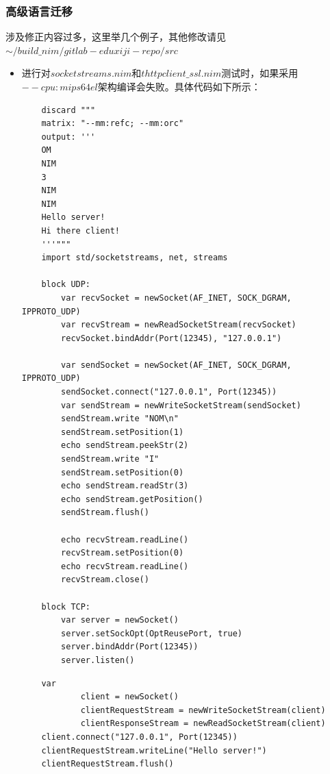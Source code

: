 \documentclass[UTF8]{ctexart}
\begin{document}
		\subsubsection{高级语言迁移} %
		涉及修正内容过多，这里举几个例子，其他修改请见$ \sim/build\_nim/gitlab-eduxiji-repo/src $ %
		\begin{itemize}[leftmargin=3.5em]
			\item 进行对$ socketstreams.nim $和$ thttpclient\_ssl.nim $测试时，如果采用$ --cpu:mips64el $架构编译会失败。具体代码如下所示：
			\begin{tcolorbox}[colback=gray!20, colframe=gray!20, rounded corners, boxrule=-5pt, width=0.8\textwidth, left=0pt, right=0pt, top=0pt, bottom=0pt]
				\begin{verbatim}
	discard """
	matrix: "--mm:refc; --mm:orc"
  	output: '''
	OM
	NIM
	3
	NIM
	NIM
	Hello server!
	Hi there client!
	'''"""
	import std/socketstreams, net, streams

	block UDP:
  		var recvSocket = newSocket(AF_INET, SOCK_DGRAM, IPPROTO_UDP)
  		var recvStream = newReadSocketStream(recvSocket)
  		recvSocket.bindAddr(Port(12345), "127.0.0.1")

  		var sendSocket = newSocket(AF_INET, SOCK_DGRAM, IPPROTO_UDP)
  		sendSocket.connect("127.0.0.1", Port(12345))
  		var sendStream = newWriteSocketStream(sendSocket)
  		sendStream.write "NOM\n"
  		sendStream.setPosition(1)
  		echo sendStream.peekStr(2)
  		sendStream.write "I"
  		sendStream.setPosition(0)
  		echo sendStream.readStr(3)
  		echo sendStream.getPosition()
  		sendStream.flush()

  		echo recvStream.readLine()
 	 	recvStream.setPosition(0)
  		echo recvStream.readLine()
  		recvStream.close()

	block TCP:
  		var server = newSocket()
  		server.setSockOpt(OptReusePort, true)
  		server.bindAddr(Port(12345))
  		server.listen()
				\end{verbatim}
			\end{tcolorbox}
			\newpage
			\begin{tcolorbox}[colback=gray!20, colframe=gray!20, rounded corners, boxrule=-5pt, width=0.8\textwidth, left=0pt, right=0pt, top=0pt, bottom=0pt]
				\begin{verbatim}
	var
    		client = newSocket()
    		clientRequestStream = newWriteSocketStream(client)
    		clientResponseStream = newReadSocketStream(client)
  	client.connect("127.0.0.1", Port(12345))
  	clientRequestStream.writeLine("Hello server!")
  	clientRequestStream.flush()
			

\end{verbatim}
\end{tcolorbox}
\end{itemize}
\end{document}
